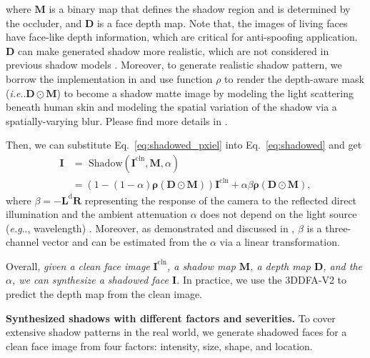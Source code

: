 \documentclass[10pt,twocolumn,letterpaper]{article}
\makeatletter
\newcommand{\reqref}[1]{Eq.~\eqref{#1}}
\DeclareRobustCommand\onedot{\futurelet\@let@token\@onedot}
\def\@onedot{\ifx\@let@token.\else.\null\fi\xspace}
\def\eg{\emph{e.g}\onedot} \def\Eg{\emph{E.g}\onedot}
\def\ie{\emph{i.e}\onedot} \def\Ie{\emph{I.e}\onedot}
\renewcommand{\paragraph}[1]{\vspace{1.25mm}\noindent\textbf{#1}}
\makeatother
\begin{document}
%
where $\mathbf{M}$ is a binary map that defines the shadow region and is determined by the occluder, and $\mathbf{D}$ is a face depth map. 
%
Note that, the images of living faces have face-like depth information, which are critical for anti-spoofing application. $\mathbf{D}$ can make generated shadow more realistic, which are not considered in previous shadow models \cite{zhang2020portrait,inoue2020learning}. 
%
Moreover, to generate realistic shadow pattern, we borrow the implementation in  \cite{hanrahan1993reflection,zhang2020portrait} and use function $\rho$ to render the depth-aware mask (\ie $\mathbf{D}\odot\mathbf{M}$) to become a shadow matte image by modeling the light scattering beneath human skin and modeling the spatial variation of the shadow via a spatially-varying blur. Please find more details in \cite{zhang2020portrait}.
%

Then, we can substitute \reqref{eq:shadowed_pxiel} into \reqref{eq:shadowed} and get
%
\begin{align}\label{eq:shadowedv2}
\mathbf{I} & =  \text{~Shadow}(\mathbf{I}^\text{cln}, \mathbf{M}, \alpha) \nonumber\\
& = (1-(1-\alpha)\mathbf{\rho}(\mathbf{D}\odot\mathbf{M}))\mathbf{I}^\text{cln}
+\alpha\beta\mathbf{\rho}(\mathbf{D}\odot\mathbf{M}),
\end{align}
%
where $\beta=-\mathbf{L}^\mathrm{d}\mathbf{R}$
representing the response of the camera to the reflected direct illumination and the ambient attenuation $\alpha$ does not depend on the light source (\eg, wavelength) \cite{shor2008the}. 
%
Moreover, as demonstrated and discussed in \cite{inoue2020learning}, $\beta$ is a three-channel vector and can be estimated from the $\alpha$ via a linear transformation. 

Overall, \textit{given a clean face image} $\mathbf{I}^\text{cln}$\textit{, a shadow map $\mathbf{M}$, a depth map $\mathbf{D}$, and the $\alpha$, we can synthesize a shadowed face $\mathbf{I}$.} In practice, we use the 3DDFA-V2 \cite{guo2020towards} to predict the depth map from the clean image.


%
\paragraph{Synthesized shadows with different factors and severities.}
%
To cover extensive shadow patterns in the real world, we generate shadowed faces for a clean face image from four factors: intensity, size, shape, and location. 
\end{document}
